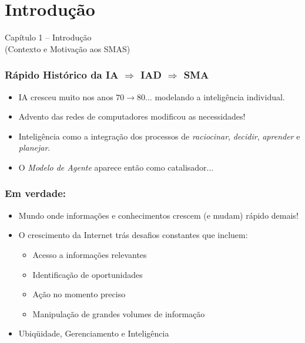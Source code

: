 

\section{Introdução}


\begin{frame}

\begin{center}
{\huge Capítulo 1 -- Introdução}\\
(Contexto e Motivação aos SMAS)
\end{center}

\end{frame}

\begin{frame}

  \frametitle{Rápido Histórico da IA $\Rightarrow$  IAD $\Rightarrow$ SMA}
    
\begin{itemize}
  \item IA cresceu muito nos anos $70 \rightarrow 80 ...$
   modelando a inteligência individual.
  \item  Advento das redes de computadores modificou as necessidades!
  \item  Inteligência como a integração dos processos de \textit{raciocinar},    \textit{decidir}, \textit{aprender} e  \textit{planejar}.
  \item  O \textit{Modelo de Agente} aparece então como catalisador...
\end{itemize}


\end{frame}

\begin{frame} %

 \frametitle{Em verdade:}

\begin{itemize}
  \item Mundo onde informações e conhecimentos crescem (e mudam) rápido demais!
    \item O crescimento da Internet trás desafios constantes que incluem:
    \begin{itemize}
  \item Acesso a informações relevantes
  \item Identificação de oportunidades
    \item Ação no momento preciso
  \item Manipulação de grandes volumes de informação
\end{itemize}
 \item Ubiqüidade, Gerenciamento e Inteligência
\end{itemize}

\end{frame}


